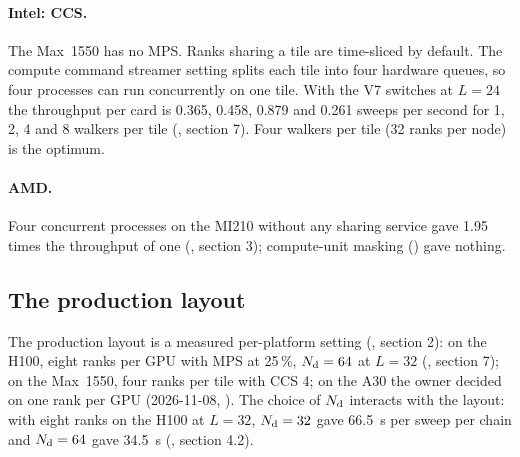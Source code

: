 \paragraph{Intel: CCS.} The Max~1550 has no MPS. Ranks sharing a tile are time-sliced by default. The compute command streamer setting  splits each tile into four hardware queues, so four processes can run concurrently on one tile. With the V7 switches at $L=24$ the throughput per card is 0.365, 0.458, 0.879 and 0.261 sweeps per second for 1, 2, 4 and 8 walkers per tile (, section 7). %
Four walkers per tile (32 ranks per node) is the optimum.


\paragraph{AMD.} Four concurrent processes on the MI210 without any sharing service gave 1.95 times the throughput of one (, section 3); compute-unit masking () gave nothing. %

\subsection{The production layout}

The production layout is a measured per-platform setting (, section 2): on the H100, eight ranks per GPU with MPS at 25\,\%, $N_{\rm d}=64$ at $L=32$ (, section 7); on the Max~1550, four ranks per tile with CCS 4; on the A30 the owner decided on one rank per GPU (2026-11-08, ). The choice of $N_{\rm d}$ interacts with the layout: with eight ranks on the H100 at $L=32$, $N_{\rm d}=32$ gave 66.5~s per sweep per chain and $N_{\rm d}=64$ gave 34.5~s (, section 4.2). %
